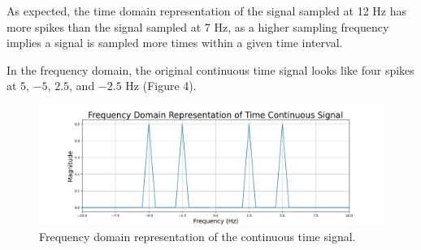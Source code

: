 \documentclass{article}
\begin{document}

    
    

As expected, the time domain representation of the signal sampled at 12 Hz has more spikes than the signal sampled at 7 Hz, as a higher sampling frequency implies a signal is sampled more times within a given time interval.

In the frequency domain, the original continuous time signal looks like four spikes at $5$, $-5$, $2.5$, and $-2.5$ Hz (Figure 4).
\begin{figure}[H]
    \includegraphics[width=\linewidth]{images/freqdom_multiple.png}
    \caption{Frequency domain representation of the continuous time signal.}
    \label{fig:enter-label}
\end{figure}
\end{document}
